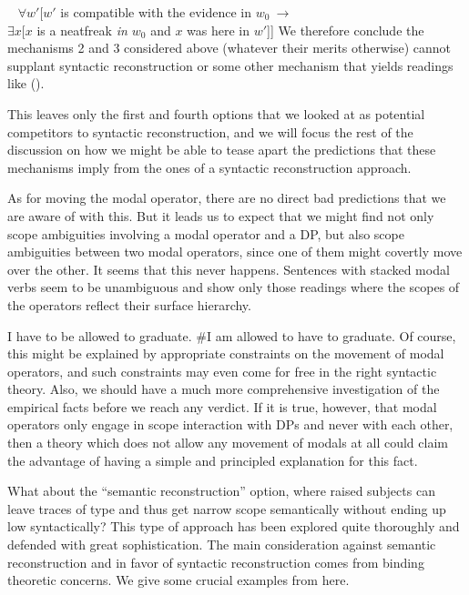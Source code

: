 \ex~ $\forall w'[w'$ is compatible with the evidence in $w_{0}\ \rightarrow$ \\
\hfill$\exists x[x$ is a neatfreak \emph{in $w_{0}$} and $x$ was here in $w'$]]
\xe
%
We therefore conclude the mechanisms 2 and 3 considered above (whatever their
merits otherwise) cannot supplant syntactic reconstruction or some other
mechanism that yields readings like (\blastx).

This leaves only the first and fourth options that we looked at as potential
competitors to syntactic reconstruction, and we will focus the rest of the
discussion on how we might be able to tease apart the predictions that these
mechanisms imply from the ones of a syntactic reconstruction approach.

As for moving the modal operator, there are no direct bad predictions that we
are aware of with this. But it leads us to expect that we might find not only
scope ambiguities involving a modal operator and a DP, but also scope
ambiguities between two modal operators, since one of them might covertly move
over the other. It seems that this never happens. Sentences with stacked modal
verbs seem to be unambiguous and show only those readings where the scopes of
the operators reflect their surface hierarchy.

\pex
\a I have to be allowed to graduate.
\a \#I am allowed to have to graduate.
\xe
%
%
Of course, this might be explained by appropriate constraints on the movement of
modal operators, and such constraints may even come for free in the right
syntactic theory. Also, we should have a much more comprehensive investigation
of the empirical facts before we reach any verdict. If it is true, however, that
modal operators only engage in scope interaction with DPs and never with each
other, then a theory which does not allow any movement of modals at all could
claim the advantage of having a simple and principled explanation for this fact.

What about the ``semantic reconstruction'' option, where raised subjects can
leave traces of type  and thus get narrow scope
semantically without ending up low syntactically? This type of approach has been
explored quite thoroughly and defended with great sophistication. The main
consideration against semantic reconstruction and in favor of syntactic
reconstruction comes from binding theoretic concerns. We give some crucial
examples from \cite{fox-2000-book} here.


